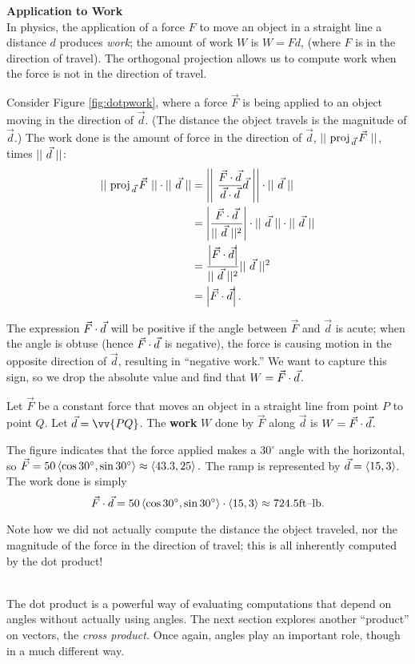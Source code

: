 \noindent\textbf{\large Application to Work}\\

In physics, the application of a force $F$ to move an object in a straight line a distance $d$ produces \emph{work}; the amount of work $W$ is $W=Fd$, (where $F$ is in the direction of travel). The orthogonal projection allows us to compute work when the force is not in the direction of travel.

Consider Figure \ref{fig:dotpwork}, where a force $\vec F$ is being applied to an object moving in the direction of $\vec d$. (The distance the object travels is the magnitude of $\vec d$.) The work done is the amount of force in the direction of $\vec d$, $\norm{\proj Fd}$, times $\vnorm d$:
\begin{align*}
\norm{\proj Fd}\cdot\vnorm d &= \snorm{\frac{\dotp Fd}{\dotp dd}\vec d}\cdot \vnorm d \\
		&= \left|\frac{\dotp Fd}{\vnorm d^2}\right|\cdot \vnorm d\cdot\vnorm d\\
		&= \frac{\left|\dotp Fd\right|}{\vnorm d^2}\vnorm d^2\\
		&= \left|\dotp Fd\right|.
\end{align*}

The expression $\dotp Fd$ will be positive if the angle between $\vec F$ and $\vec d$ is acute; when the angle is obtuse (hence $\dotp Fd$ is negative), the force is causing motion in the opposite direction of $\vec d$, resulting in ``negative work.'' We want to capture this sign, so we drop the absolute value and find that $W = \dotp Fd$.

{Let $\vec F$ be a constant force that moves an object in a straight line from point $P$ to point $Q$. Let $\vec d = \vv{PQ}$. The \textbf{work} $W$ done by $\vec F$ along $\vec d$ is $W = \dotp Fd$.
}

{The figure indicates that the force applied makes a $30^\circ$ angle with the horizontal, so $\vec F = 50\la \cos 30^\circ,\sin 30^\circ\ra \approx \la 43.3,25\ra.$ The ramp is represented by $\vec d  = \la 15,3\ra$. The work done is simply
$$\dotp Fd = 50\la \cos 30^\circ,\sin 30^\circ\ra \cdot \la 15,3\ra \approx 724.5 \text{ft--lb}.$$

Note how we did not actually compute the distance the object traveled, nor the magnitude of the force in the direction of travel; this is all inherently computed by the dot product!
}\\

The dot product is a powerful way of evaluating computations that depend on angles without actually using angles. The next section explores another ``product'' on vectors, the \emph{cross product.} Once again, angles play an important role, though in a much different way.

